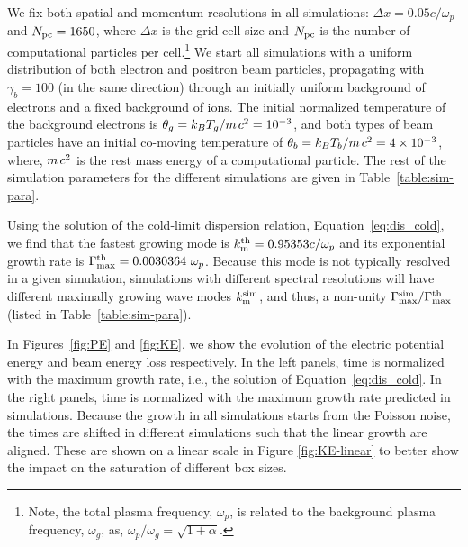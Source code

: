 \documentclass[pop,numberedappendix,iop]{aeb_emulateapj_2015}
\begin{document}
We fix both spatial and momentum resolutions in all simulations: $\Delta x = 0.05 c / \omega_p$ and $N_{\rm pc} = 1650$, where $\Delta x$ is the grid cell size and $N_{\rm pc}$ is the number of computational particles per cell.\footnote{Note, the total plasma frequency, $\omega_p$, is related to the background plasma frequency, $\omega_g$, as, $\omega_p / \omega_g = \sqrt{1+\alpha}$.
}
We start all simulations with a uniform distribution of both electron and positron beam particles, propagating with $\gamma_b=100$ (in the same direction) through an initially uniform background of electrons and a fixed background of ions. The initial normalized temperature of the background electrons is $\theta_g = k_B T_g/m \hspace{.05cm} c^2 = 10^{-3}$, and both types of beam particles have an initial co-moving temperature of $\theta_b = k_B T_b/m \hspace{.05cm} c^2 = 4\times10^{-3}$, where, $m \hspace{.05cm} c^2$ is the rest mass energy of a computational particle.
The rest of the simulation parameters for the  different simulations are given in Table~\ref{table:sim-para}.


Using the solution of the cold-limit dispersion relation, Equation~\eqref{eq:dis_cold}, we find that the fastest growing mode is $k^{\rm th}_{\rm m} = 0.95353  c/\omega_p$ and its exponential growth rate is $\Gamma^{\rm th}_{\rm max} = 0.0030364 \text{ } \omega_p$.
Because this mode is not typically resolved in a given simulation, simulations with different spectral resolutions will have different maximally growing wave modes $k^{\rm sim}_{\rm m}$, and thus, a non-unity $\Gamma^{\rm sim}_{\rm max}/\Gamma^{\rm th}_{\rm max}$ 
(listed in Table~\ref{table:sim-para}). 



In Figures~\ref{fig:PE} and \ref{fig:KE}, we show the evolution of the electric potential energy and beam energy loss respectively.
In the left panels, time is normalized with the maximum growth rate, i.e., the solution of Equation~\eqref{eq:dis_cold}.
In the right panels, time is normalized with the maximum growth rate predicted in simulations. 
Because the growth in all simulations starts from the Poisson noise, the times are shifted in different simulations such that the linear growth are aligned.
These are shown on a linear scale in Figure \ref{fig:KE-linear} to better show the impact on the saturation of different box sizes.
\end{document}

